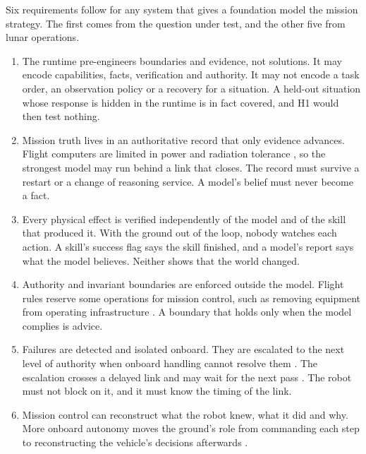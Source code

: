 Six requirements follow for any system that gives a foundation model the mission strategy. The first comes from the
question under test, and the other five from lunar operations.
\begin{enumerate}[label=R\arabic*]
  \item \label{req:no-solution} The runtime pre-engineers boundaries and evidence, not solutions. It may encode
  capabilities, facts, verification and authority. It may not encode a task order, an observation policy or a recovery
  for a situation. A held-out situation whose response is hidden in the runtime is in fact covered, and H1 would then
  test nothing.
  \item \label{req:facts} Mission truth lives in an authoritative record that only evidence advances. Flight computers
  are limited in power and radiation tolerance \citep{nasa2024hpsc}, so the strongest model may run behind a link that
  closes. The record must survive a restart or a change of reasoning service. A model's belief must never become a
  fact.
  \item \label{req:verification} Every physical effect is verified independently of the model and of the skill that
  produced it. With the ground out of the loop, nobody watches each action. A skill's success flag says the skill
  finished, and a model's report says what the model believes. Neither shows that the world changed.
  \item \label{req:authority} Authority and invariant boundaries are enforced outside the model. Flight rules reserve
  some operations for mission control, such as removing equipment from operating infrastructure \citep{cfr1214403}. A
  boundary that holds only when the model complies is advice.
  \item \label{req:fdir} Failures are detected and isolated onboard. They are escalated to the next level of authority
  when onboard handling cannot resolve them \citep{ecss2008operability}. The escalation crosses a delayed link and may
  wait for the next pass \citep{cerf2007dtn}. The robot must not block on it, and it must know the timing of the link.
  \item \label{req:trace} Mission control can reconstruct what the robot knew, what it did and why. More onboard
  autonomy moves the ground's role from commanding each step to reconstructing the vehicle's decisions afterwards
  \citep{castano2022ops}.
\end{enumerate}
